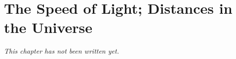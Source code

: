 \chapter{The Speed of Light; Distances in the Universe}\label{ch:g8:speed-of-light}


\emph{This chapter has not been written yet.}
